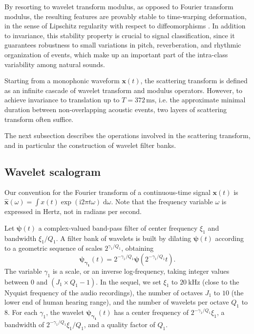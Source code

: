 \documentclass[journal]{IEEEtran}
\makeatletter
\newcommand*{\ie}{i.e.\@\xspace}
\makeatother
\begin{document}
By resorting to wavelet transform modulus, as opposed to Fourier transform modulus, the resulting features are provably stable to time-warping deformation,
in the sense of Lipschitz regularity with respect to diffeomorphisms \cite{Mallat2012}.
In addition to invariance, this stability property is crucial to signal classification, since it guarantees robustness to small variations in pitch, reverberation, and rhythmic organization of events, which make up an important part of the intra-class variability among natural sounds.

Starting from a monophonic waveform $\boldsymbol{x}(t)$, the scattering transform is defined as an infinite cascade of wavelet transform and modulus operators.
However, to achieve invariance to translation up to $T = 372\,\mathrm{ms}$, \ie the approximate minimal duration between non-overlapping acoustic events, two layers of scattering transform often suffice.

The next subsection describes the operations involved in the scattering transform, and in particular the construction of wavelet filter banks.

\subsection{Wavelet scalogram}
Our convention for the Fourier transform of a continuous-time signal $\boldsymbol{x}(t)$ is $\boldsymbol{\hat{x}}(\omega) = \int x(t) \exp(\mathrm{i} 2\pi t \omega) \; \mathrm{d}\omega$. Note that the frequency variable $\omega$ is expressed in Hertz, not in radians per second.

Let $\boldsymbol{\psi}(t)$ a complex-valued band-pass filter of
center frequency $\xi_1$ and bandwidth $\xi_1/Q_1$.
A filter bank of wavelets is built by dilating $\boldsymbol{\psi}(t)$
according to a geometric sequence of scales $2^{\gamma_1/Q_1}$, obtaining
\begin{equation}
\boldsymbol{\psi_{\gamma_1}}(t) = 2^{-\gamma_1/Q_1} \boldsymbol{\psi}(2^{-\gamma_1/Q_1} t)\mbox{.}
\end{equation}
The variable $\gamma_1$ is a scale, or an inverse log-frequency, taking integer values between $0$ and $(J_1 \times Q_1 - 1)$.
In the sequel, we set $\xi_1$ to $20~\mathrm{kHz}$ (close to the Nyquist frequency of the audio recordings), the number of octaves $J_1$ to $10$ (the lower end of human hearing range), and the number of wavelets per octave $Q_1$ to $8$.
For each $\gamma_1$, the wavelet $\boldsymbol{\psi_{\gamma_1}}(t)$
has a center frequency of $2^{-\gamma_1/Q_1}\xi_1$, a bandwidth of $2^{-\gamma_1/Q_1}\xi_1/Q_1$, and a quality factor of $Q_1$.
\end{document}
